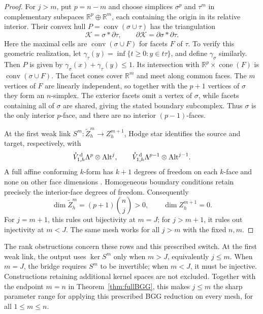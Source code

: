 \documentclass[10pt]{amsart}
\numberwithin{equation}{section}
\newcommand{\dd}{\,{\rm d}}
\begin{document}
\begin{proof}
For $j>m$, put $p=n-m$ and choose simplices $\sigma^p$ and
$\tau^m$ in complementary subspaces $\mathbb R^p\oplus\mathbb R^m$,
each containing the origin in its relative interior.
Their convex hull $P=\operatorname{conv}(\sigma\cup\tau)$ has the
triangulation
\[
\mathcal K=\sigma*\partial\tau,\qquad
\partial\mathcal K=\partial\sigma*\partial\tau.
\]
Here the maximal cells are $\operatorname{conv}(\sigma\cup F)$ for
facets $F$ of $\tau$.
To verify this geometric realization, let
$\gamma_\tau(y)=\inf\{t\geq0:y\in t\tau\}$, and define $\gamma_\sigma$
similarly. Then $P$ is given by
$\gamma_\sigma(x)+\gamma_\tau(y)\leq1$.
Its intersection with $\mathbb R^p\times\operatorname{cone}(F)$ is
$\operatorname{conv}(\sigma\cup F)$.
The facet cones cover $\mathbb R^m$ and meet along common faces.
The $m$ vertices of $F$ are linearly independent, so together with the
$p+1$ vertices of $\sigma$ they form an $n$-simplex.
The exterior facets omit a vertex of $\sigma$, while facets containing
all of $\sigma$ are shared, giving the stated boundary subcomplex.
Thus $\sigma$ is the only interior $p$-face, and there are no interior
$(p-1)$-faces.

At the first weak link $S^m:\widetilde Z_h^m\to Z_h^{m+1}$,
Hodge star identifies the source and target, respectively, with
\[
\mathring V_{1,h}^{\dd}\Lambda^p\otimes{\rm Alt}^j,
\qquad
\mathring V_{1,h}^{\dd}\Lambda^{p-1}\otimes{\rm Alt}^{j-1}.
\]
A full affine conforming $k$-form has $k+1$ degrees of freedom on
each $k$-face and none on other face dimensions
\cite[Theorem 5.5]{ArnoldFalkWinther2010}.
Homogeneous boundary conditions retain precisely the interior-face
degrees of freedom. Consequently
\[
\dim\widetilde Z_h^m=(p+1)\binom nj>0,\qquad
\dim Z_h^{m+1}=0.
\]
For $j=m+1$, this rules out bijectivity at $m=J$;
for $j>m+1$, it rules out injectivity at $m<J$.
The same mesh works for all $j>m$ with the fixed $n,m$.
\end{proof}

The rank obstructions concern these rows and this prescribed switch.
At the first weak link, the output uses $\ker S^{m}$ only when
$m>J$, equivalently $j\leq m$. When $m=J$, the bridge requires $S^m$
to be invertible; when $m<J$, it must be injective.
Constructions retaining additional kernel spaces are not excluded.
Together with the endpoint $m=n$ in Theorem~\ref{thm:fullBGG}, this makes
$j\leq m$ the sharp parameter range for applying this prescribed BGG
reduction on every mesh, for all $1\leq m\leq n$.
\end{document}
